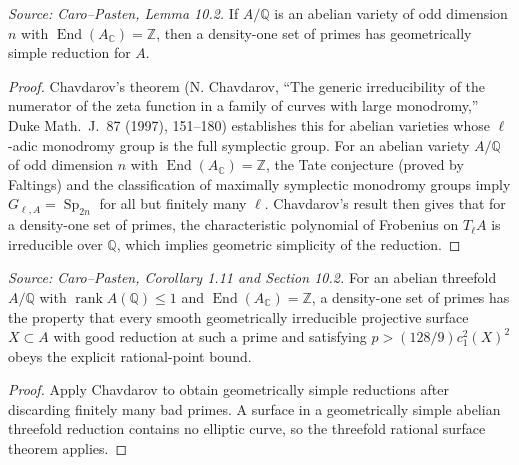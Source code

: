 \begin{lemma}
  \label{lem:cp_chavdarov_simple_reduction}
  \textit{Source: Caro--Pasten, Lemma 10.2.}
  If \(A/\mathbb Q\) is an abelian variety of odd dimension \(n\) with
  \(\operatorname{End}(A_\mathbb C)=\mathbb Z\), then a density-one set of
  primes has geometrically simple reduction for \(A\).
\end{lemma}
\begin{proof}
  Chavdarov's theorem (N. Chavdarov, ``The generic irreducibility of the numerator
  of the zeta function in a family of curves with large monodromy,'' Duke Math.\ J.\
  87 (1997), 151--180) establishes this for abelian varieties whose
  \(\ell\)-adic monodromy group is the full symplectic group.  For an abelian
  variety \(A/\mathbb Q\) of odd dimension \(n\) with
  \(\operatorname{End}(A_\mathbb C)=\mathbb Z\), the Tate conjecture (proved by
  Faltings) and the classification of maximally symplectic monodromy groups
  imply \(G_{\ell,A}=\operatorname{Sp}_{2n}\) for all but finitely many \(\ell\).
  Chavdarov's result then gives that for a density-one set of primes, the
  characteristic polynomial of Frobenius on \(T_\ell A\) is irreducible over
  \(\mathbb Q\), which implies geometric simplicity of the reduction.
\end{proof}

\begin{corollary}
  \label{cor:cp_dim3_density_application}
  \textit{Source: Caro--Pasten, Corollary 1.11 and Section 10.2.}
  For an abelian threefold \(A/\mathbb Q\) with
  \(\operatorname{rank}A(\mathbb Q)\le1\) and
  \(\operatorname{End}(A_\mathbb C)=\mathbb Z\), a density-one set of primes
  has the property that every smooth geometrically irreducible projective
  surface \(X\subset A\) with good reduction at such a prime and satisfying
  \(p>(128/9)c_1^2(X)^2\) obeys the explicit rational-point bound.
\end{corollary}
\begin{proof}
  Apply Chavdarov to obtain geometrically simple reductions after discarding
  finitely many bad primes.  A surface in a geometrically simple abelian
  threefold reduction contains no elliptic curve, so the threefold rational
  surface theorem applies.
\end{proof}

